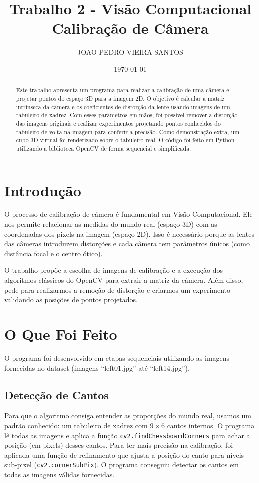 \documentclass[twocolumn]{article}
\title{Trabalho 2 - Visão Computacional \\ \large Calibração de Câmera}
\author{JOAO PEDRO VIEIRA SANTOS}
\date{\today}
\begin{document}
\maketitle

\begin{abstract}
Este trabalho apresenta um programa para realizar a calibração de uma câmera e projetar pontos do espaço 3D para a imagem 2D. O objetivo é calcular a matriz intrínseca da câmera e os coeficientes de distorção da lente usando imagens de um tabuleiro de xadrez. Com esses parâmetros em mãos, foi possível remover a distorção das imagens originais e realizar experimentos projetando pontos conhecidos do tabuleiro de volta na imagem para conferir a precisão. Como demonstração extra, um cubo 3D virtual foi renderizado sobre o tabuleiro real. O código foi feito em Python utilizando a biblioteca OpenCV de forma sequencial e simplificada.
\end{abstract}

\section{Introdução}
O processo de calibração de câmera é fundamental em Visão Computacional. Ele nos permite relacionar as medidas do mundo real (espaço 3D) com as coordenadas dos pixels na imagem (espaço 2D). Isso é necessário porque as lentes das câmeras introduzem distorções e cada câmera tem parâmetros únicos (como distância focal e o centro ótico).

O trabalho propõe a escolha de imagens de calibração e a execução dos algoritmos clássicos do OpenCV para extrair a matriz da câmera. Além disso, pede para realizarmos a remoção de distorção e criarmos um experimento validando as posições de pontos projetados.

\section{O Que Foi Feito}
O programa foi desenvolvido em etapas sequenciais utilizando as imagens fornecidas no dataset (imagens ``left01.jpg'' até ``left14.jpg''). 

\subsection{Detecção de Cantos}
Para que o algoritmo consiga entender as proporções do mundo real, usamos um padrão conhecido: um tabuleiro de xadrez com $9 \times 6$ cantos internos.
O programa lê todas as imagens e aplica a função \texttt{cv2.findChessboardCorners} para achar a posição (em pixels) desses cantos. Para ter mais precisão na calibração, foi aplicada uma função de refinamento que ajusta a posição do canto para níveis sub-pixel (\texttt{cv2.cornerSubPix}). O programa conseguiu detectar os cantos em todas as imagens válidas fornecidas.
\end{document}
